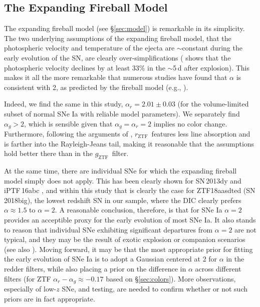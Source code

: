 \documentclass[twocolumn]{./aastex63}
\newcommand{\rztf}{$r_\mathrm{ZTF}$}
\newcommand{\gztf}{$g_\mathrm{ZTF}$}
\begin{document}
\subsection{The Expanding Fireball Model}

The expanding fireball model (see \S\ref{sec:model}) is remarkable in its
simplicity. The two underlying assumptions of the expanding fireball model, that
the photospheric velocity and temperature of the ejecta are $\sim$constant
during the early evolution of the SN, are clearly over-simplifications
(\citealt{Parrent12} shows that the photospheric velocity declines by at least
33\% in the $\sim$5\,d after explosion). This makes it all the more remarkable
that numerous studies have found that $\alpha$ is consistent with 2, as
predicted by the fireball model (e.g.,
\citealt{Conley06,Hayden10,Ganeshalingam11,Gonzalez-Gaitan12,Zheng17a}).

Indeed, we find the same in this study, $\alpha_r = 2.01 \pm 0.03$ (for the
volume-limited subset of normal SNe Ia with reliable model parameters). We
separately find $\alpha_g > 2$, which is sensible given that $\alpha_g =
\alpha_r = 2$ implies no color change. Furthermore, following the arguments of
\citet{Riess99a}, \rztf\ features less line absorption and is farther into the
Rayleigh-Jeans tail, making it reasonable that the assumptions hold better there
than in the \gztf\ filter.

At the same time, there are individual SNe for which the expanding fireball
model simply does not apply. This has been clearly shown for SN\,2013dy and
iPTF\,16abc \citep{Zheng13,Miller18}, and within this study that is clearly the
case for ZTF18aasdted (SN\,2018big), the lowest redshift SN in our sample, where
the DIC clearly prefers $\alpha \approx 1.5$ to $\alpha = 2$. A reasonable
conclusion, therefore, is that for SNe Ia $\alpha = 2$ provides an acceptible
proxy for the early evolution of most SNe Ia. It also stands to reason that
individual SNe exhibiting significant departures from $\alpha = 2$ are not
typical, and they may be the result of exotic explosion or companion scenarios
(see also \citealt{Miller18}). Moving forward, it may be that the most
appropriate prior for fitting the early evolution of SNe Ia is to adopt a
Gaussian centered at 2 for $\alpha$ in the redder filters, while also placing a
prior on the difference in $\alpha$ across different filters (for ZTF $\alpha_r
- \alpha_g \approx -0.17$ based on \S\ref{sec:colors}). More observations,
especially of low-$z$ SNe, and testing, are needed to confirm whether or not
such priors are in fact appropriate.
\end{document}
